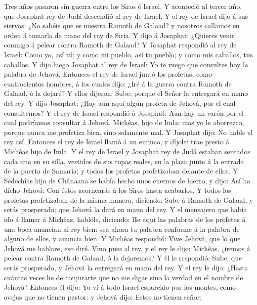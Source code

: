  Tres años pasaron sin guerra entre los Siros é Israel.
 Y aconteció al tercer año, que Josaphat rey de Judá
descendió al rey de Israel.  Y el rey de Israel dijo á sus
siervos: ¿No sabéis que es nuestra Ramoth de Galaad? y nosotros callamos
en orden á tomarla de mano del rey de Siria.  Y dijo á
Josaphat: ¿Quieres venir conmigo á pelear contra Ramoth de Galaad? Y
Josaphat respondió al rey de Israel: Como yo, así tú; y como mi pueblo,
así tu pueblo; y como mis caballos, tus caballos.  Y dijo
luego Josaphat al rey de Israel: Yo te ruego que consultes hoy la
palabra de Jehová.  Entonces el rey de Israel juntó los
profetas, como cuatrocientos hombres, á los cuales dijo: ¿Iré á la
guerra contra Ramoth de Galaad, ó la dejaré? Y ellos dijeron: Sube;
porque el Señor la entregará en mano del rey.  Y dijo
Josaphat: ¿Hay aún aquí algún profeta de Jehová, por el cual
consultemos?  Y el rey de Israel respondió á Josaphat: Aun
hay un varón por el cual podríamos consultar á Jehová, Michêas, hijo de
Imla: mas yo le aborrezco, porque nunca me profetiza bien, sino
solamente mal. Y Josaphat dijo: No hable el rey así. 
Entonces el rey de Israel llamó á un eunuco, y díjole: trae presto á
Michêas hijo de Imla.  Y el rey de Israel y Josaphat rey de
Judá estaban sentados cada uno en su silla, vestidos de sus ropas
reales, en la plaza junto á la entrada de la puerta de Samaria; y todos
los profetas profetizaban delante de ellos.  Y Sedechîas
hijo de Chânaana se había hecho unos cuernos de hierro, y dijo: Así ha
dicho Jehová: Con éstos acornearás á los Siros hasta acabarlos.
 Y todos los profetas profetizaban de la misma manera,
diciendo: Sube á Ramoth de Galaad, y serás prosperado; que Jehová la
dará en mano del rey.  Y el mensajero que había ido á
llamar á Michêas, hablóle, diciendo: He aquí las palabras de los
profetas á una boca anuncian al rey bien: sea ahora tu palabra conforme
á la palabra de alguno de ellos, y anuncia bien.  Y Michêas
respondió: Vive Jehová, que lo que Jehová me hablare, eso diré.
 Vino pues al rey, y el rey le dijo: Michêas, ¿iremos á
pelear contra Ramoth de Galaad, ó la dejaremos? Y él le respondió: Sube,
que serás prosperado, y Jehová la entregará en mano del rey.
 Y el rey le dijo: ¿Hasta cuántas veces he de conjurarte
que no me digas sino la verdad en el nombre de Jehová? 
Entonces él dijo: Yo ví á todo Israel esparcido por los montes, como
ovejas que no tienen pastor: y Jehová dijo: Estos no tienen señor;
